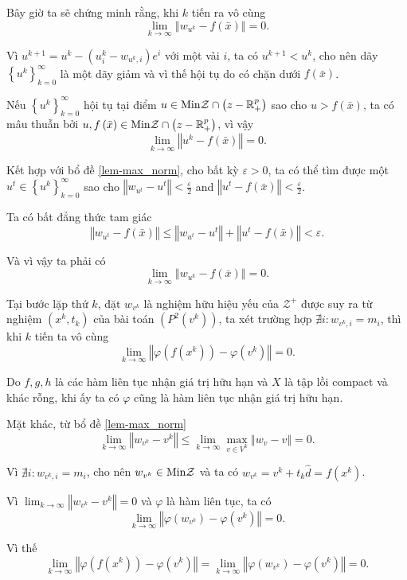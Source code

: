 \begin{cm}
Bây giờ ta sẽ chứng minh rằng, khi $k$ tiến ra vô cùng
\[
\lim_{k\rightarrow\infty}\left\Vert w_{u^{k}}-f\left(\bar{x}\right)\right\Vert =0.
\]

Vì $u^{k+1}=u^{k}-\left(u_{i}^{k}-w_{u^{k},i}\right)e^{i}$ với một vài  $i$, ta có $u^{k+1}<u^{k}$, cho nên dãy $\left\{ u^{k}\right\} _{k=0}^{\infty}$
là một dãy giảm và vì thế hội tụ do có chặn dưới $f\left(\bar{x}\right)$.

Nếu $\left\{ u^{k}\right\} _{k=0}^{\infty}$ hội tụ tại điểm $u\in{\rm Min}\mathcal{Z}\cap\left(z-\mathbb{R}_{+}^{p}\right)$ sao cho $u>f\left(\bar{x}\right)$, ta có mâu thuẫn bởi $u,f\left(\bar{x}\right)\in{\rm Min}\mathcal{Z}\cap\left(z-\mathbb{R}_{+}^{p}\right)$,
vì vậy
\[
\lim_{k\rightarrow\infty}\left\Vert u^{k}-f\left(\bar{x}\right)\right\Vert =0.
\]

Kết hợp với bổ đề \ref{lem-max_norm}, cho bất kỳ $\varepsilon>0$,
ta có thể tìm được một $u^{t}\in\left\{ u^{k}\right\} _{k=0}^{\infty}$ sao cho $\left\Vert w_{u^{t}}-u^{t}\right\Vert <\frac{\varepsilon}{2}$
and $\left\Vert u^{t}-f\left(\bar{x}\right)\right\Vert <\frac{\varepsilon}{2}$. 

Ta có bất đẳng thức tam giác
\[
\left\Vert w_{u^{t}}-f\left(\bar{x}\right)\right\Vert \leq\left\Vert w_{u^{t}}-u^{t}\right\Vert +\left\Vert u^{t}-f\left(\bar{x}\right)\right\Vert <\varepsilon.
\]

Và vì vậy ta phải có
\[
\lim_{k\rightarrow\infty}\left\Vert w_{u^{k}}-f\left(\bar{x}\right)\right\Vert =0.
\]

\end{cm}

\begin{bd}\label{lem-converge} Tại bước lặp thứ $k$, đặt
$w_{v^{k}}$ là nghiệm hữu hiệu yếu của $\mathcal{Z}^{+}$
được suy ra từ nghiệm $\left(x^{k},t_{k}\right)$ của bài toán $(P^{2}(v^{k}))$, ta xét trường hợp $\nexists i:w_{v^{k},i}=m_{i}$, thì khi $k$ tiến ta vô cùng
\[
\lim_{k\rightarrow\infty}\left\Vert \varphi(f(x^{k}))-\varphi(v^{k})\right\Vert =0.
\]
\end{bd}

\begin{cm} Do $f,g,h$ là các hàm liên tục nhận giá trị hữu hạn và $X$ là tập lồi compact và khác rỗng, khi ấy ta có $\varphi$ cũng là hàm liên tục nhận giá trị hữu hạn.

Mặt khác, từ bổ đề \ref{lem-max_norm}
\[
\lim_{k\rightarrow\infty}\left\Vert w_{v^{k}}-v^{k}\right\Vert \le\lim_{k\rightarrow\infty}\max_{v\in V^{k}}\left\Vert w_{v}-v\right\Vert =0.
\]

Vì $\nexists i:w_{v^{k},i}=m_{i}$, cho nên $w_{v^{k}}\in{\rm Min}\mathcal{Z}$ và ta có $w_{v^{k}}=v^{k}+t_{k}\hat{d}=f\left(x^{k}\right)$.

Vì $\lim_{k\rightarrow\infty}\left\Vert w_{v^{k}}-v^{k}\right\Vert =0$
và $\varphi$ là hàm liên tục, ta có
\[
\lim_{k\rightarrow\infty}\left\Vert \varphi(w_{v^{k}})-\varphi(v^{k})\right\Vert =0.
\]

Vì thế
\[
\lim_{k\rightarrow\infty}\left\Vert \varphi(f(x^{k}))-\varphi(v^{k})\right\Vert =\lim_{k\rightarrow\infty}\left\Vert \varphi(w_{v^{k}})-\varphi(v^{k})\right\Vert =0.
\]
\end{cm}

